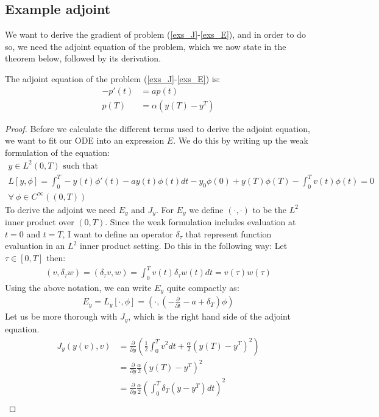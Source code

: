 \subsection{Example adjoint}
We want to derive the gradient of problem (\ref{exs_J}-\ref{exs_E}), and in order to do so, we need the adjoint equation of the problem, which we now state in the theorem below, followed by its derivation.
\begin{theorem}
The adjoint equation of the problem (\ref{exs_J}-\ref{exs_E}) is:
\begin{align*}     
-p'(t) &= ap(t) \\
p(T) &= \alpha(y(T)-y^T)     
\end{align*}
\end{theorem}
\begin{proof}
Before we calculate the different terms used to derive the adjoint equation, we want to fit our ODE into an expression $E$. We do this by writing up the weak formulation of the equation:
\begin{gather*}
\textrm{$y \in L^2(0,T)$ such that}\\
L[y,\phi] = \int_0^T-y(t)\phi'(t)-ay(t)\phi(t)dt -y_0\phi(0)+y(T)\phi(T)-\int_0^Tv(t)\phi(t)=0\\ \forall \ \phi \in C^{\infty}((0,T))
\end{gather*}
To derive the adjoint we need $E_y$ and $J_y$. For $E_y$ we define $(\cdot,\cdot)$ to be the $L^2$ inner product over $(0,T)$. Since the weak formulation includes evaluation at $t=0$ and $t=T$, I want to define an operator $\delta_{\tau}$ that represent function evaluation in an $L^2$ inner product setting. Do this in the following way: Let $\tau \in [0,T]$ then:
\begin{align*}
(v,\delta_{\tau}w) =(\delta_{\tau}v,w) = \int_0^Tv(t)\delta_{\tau}w(t)dt = v(\tau)w(\tau)
\end{align*}
Using the above notation, we can write $E_y$ quite compactly as:
\begin{align*}
E_y=L_y[\cdot,\phi]=(\cdot,(-\frac{\partial}{\partial t} - a + \delta_T)\phi)  
\end{align*}
Let us be more thorough with $J_y$, which is the right hand side of the adjoint equation.
\begin{align*}
J_y(y(v),v) &= \frac{\partial}{\partial y}(\frac{1}{2}\int_0^Tv^2dt + \frac{\alpha}{2}(y(T)-y^T)^2) \\ &= \frac{\partial}{\partial y} \frac{\alpha}{2}(y(T)-y^T)^2 \\
&= \frac{\partial}{\partial y}\frac{\alpha}{2}(\int_0^T \delta_T(y-y^T)dt)^2 \\

\end{align*}
\end{proof}
